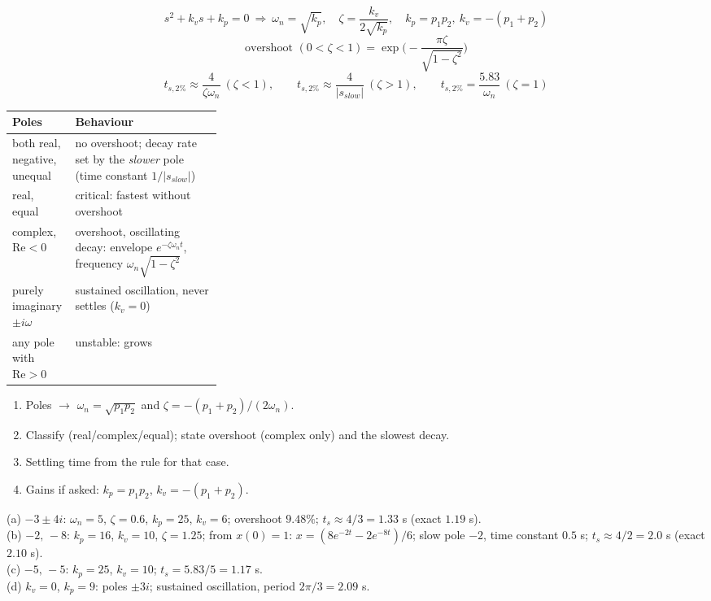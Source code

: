 \begin{multicols}{2}
\label{w8:gains}
\begin{fbx}
\[s^2+k_vs+k_p=0\ \Rightarrow\ \omega_n=\sqrt{k_p},\quad\zeta=\frac{k_v}{2\sqrt{k_p}},\quad k_p=p_1p_2,\ k_v=-(p_1+p_2)\]
\[\text{overshoot }(0<\zeta<1)=\exp\!\Big(-\frac{\pi\zeta}{\sqrt{1-\zeta^2}}\Big)\]
\[t_{s,2\%}\approx\frac4{\zeta\omega_n}\ (\zeta<1),\qquad t_{s,2\%}\approx\frac4{|s_{slow}|}\ (\zeta>1),\qquad t_{s,2\%}=\frac{5.83}{\omega_n}\ (\zeta=1)\]
\end{fbx}
\begin{tabularx}{\linewidth}{@{}>{\raggedright\arraybackslash}p{0.3\linewidth}X@{}}
\toprule Poles & Behaviour\\\midrule
both real, negative, unequal & no overshoot; decay rate set by the \emph{slower} pole (time constant $1/|s_{slow}|$)\\
real, equal & critical: fastest without overshoot\\
complex, $\mathrm{Re}<0$ & overshoot, oscillating decay: envelope $e^{-\zeta\omega_nt}$, frequency $\omega_n\sqrt{1-\zeta^2}$\\
purely imaginary $\pm i\omega$ & sustained oscillation, never settles ($k_v=0$)\\
any pole with $\mathrm{Re}>0$ & unstable: grows\\\bottomrule
\end{tabularx}
\begin{recipe}
\label{w8:poles}
\begin{enumerate}
\item Poles $\to$ $\omega_n=\sqrt{p_1p_2}$ and $\zeta=-(p_1+p_2)/(2\omega_n)$.
\item Classify (real/complex/equal); state overshoot (complex only) and the slowest decay.
\item Settling time from the rule for that case.
\item Gains if asked: $k_p=p_1p_2$, $k_v=-(p_1+p_2)$.
\end{enumerate}
\end{recipe}
\begin{worked}
(a) $-3\pm4i$: $\omega_n=5$, $\zeta=0.6$, $k_p=25$, $k_v=6$; overshoot $9.48\%$; $t_s\approx4/3=1.33$ s (exact $1.19$ s).\\
(b) $-2,\,-8$: $k_p=16$, $k_v=10$, $\zeta=1.25$; from $x(0)=1$: $x=(8e^{-2t}-2e^{-8t})/6$; slow pole $-2$, time constant $0.5$ s; $t_s\approx4/2=2.0$ s (exact $2.10$ s).\\
(c) $-5,\,-5$: $k_p=25$, $k_v=10$; $t_s=5.83/5=1.17$ s.\\
(d) $k_v=0$, $k_p=9$: poles $\pm3i$; sustained oscillation, period $2\pi/3=2.09$ s. \chk
\end{worked}


\end{multicols}
